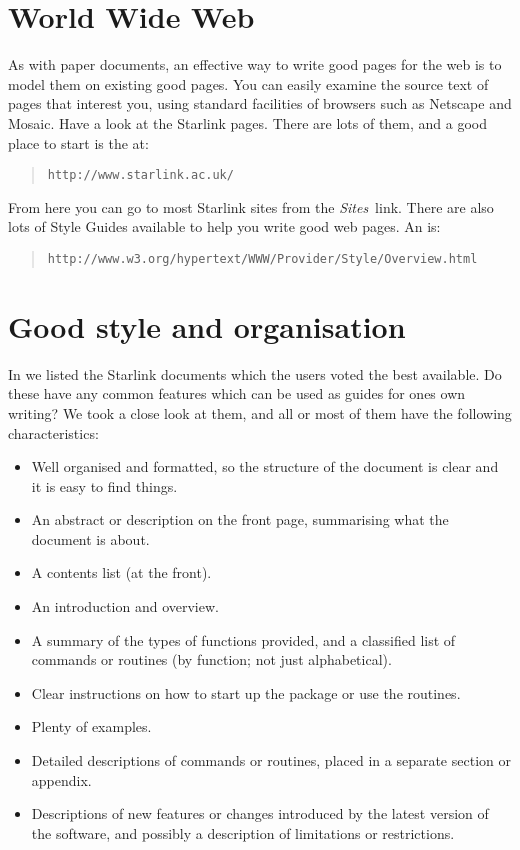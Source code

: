\documentclass[twoside,11pt,nolof]{starlink}
\begin{document}
\section{World Wide Web}

As with paper documents, an effective way to write good pages for the web
is to model them on existing good pages.
You can easily examine the source text of pages that interest you, using
standard facilities of browsers such as Netscape and Mosaic.
Have a look at the Starlink pages.
There are lots of them, and a good place to start is the
 at:
\begin{quote}
\texttt{http://www.starlink.ac.uk/}
\end{quote}
From here you can go to most Starlink sites from the \emph{Sites}\, link.
There are also lots of Style Guides available to help you write good web pages.
An  is:
\begin{quote}
\texttt{http://www.w3.org/hypertext/WWW/Provider/Style/Overview.html}
\end{quote}

\section{\label{GoodStyle}Good style and organisation}

In  we listed the Starlink documents which
the users voted the best available.
Do these have any common features which can be used as guides for ones own
writing?
We took a close look at them, and all or most of them have the following
characteristics:

\begin{itemize}
\item Well organised and formatted, so the structure of the document
is clear and it is easy to find things.
\item An abstract or description on the front page, summarising what the
document is about.
\item A contents list (at the front).
\item An introduction and overview.
\item A summary of the types of functions provided, and a classified list of
commands or routines (by function; not just alphabetical).
\item Clear instructions on how to start up the package or use the routines.
\item Plenty of examples.
\item Detailed descriptions of commands or routines, placed in a separate
section or appendix.
\item Descriptions of new features or changes introduced by the latest version
of the software, and possibly a description of limitations or restrictions.
\end{itemize}
\end{document}
